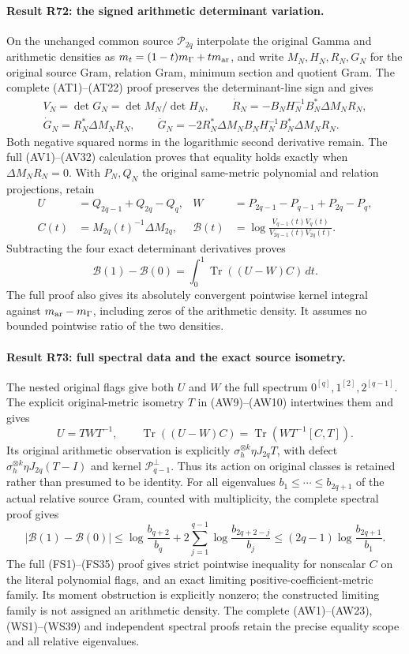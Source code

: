 \paragraph{Result R72: the signed arithmetic determinant variation.}
On the unchanged common source $\mathcal P_{2q}$ interpolate
the original Gamma and arithmetic densities as
$m_t=(1-t)m_\Gamma+tm_{\rm ar}$, and write $M_N,H_N,R_N,G_N$
for the original source Gram, relation Gram, minimum section
and quotient Gram. The complete (AT1)--(AT22) proof preserves
the determinant-line sign and gives
\[
\begin{gathered}
V_N=\det G_N=\det M_N/\det H_N,\qquad
\dot R_N=-B_NH_N^{-1}B_N^*\Delta M_NR_N,\\
\dot G_N=R_N^*\Delta M_NR_N,\qquad
\ddot G_N=-2R_N^*\Delta M_NB_NH_N^{-1}B_N^*\Delta M_NR_N.
\end{gathered}
\]
Both negative squared norms in the logarithmic second
derivative remain. The full (AV1)--(AV32) calculation proves
that equality holds exactly when $\Delta M_NR_N=0$.
With $P_N,Q_N$ the original same-metric polynomial and
relation projections, retain
\[
\begin{aligned}
U&=Q_{2q-1}+Q_{2q}-Q_q,&
W&=P_{2q-1}-P_{q-1}+P_{2q}-P_q,\\
C(t)&=M_{2q}(t)^{-1}\Delta M_{2q},&
\mathcal B(t)&=\log\frac{V_{q-1}(t)V_q(t)}{V_{2q-1}(t)V_{2q}(t)}.
\end{aligned}
\]
Subtracting the four exact determinant derivatives proves
\[
\mathcal B(1)-\mathcal B(0)=\int_0^1\operatorname{Tr}((U-W)C)\,dt.
\]
The full proof also gives its absolutely convergent
pointwise kernel integral against $m_{\rm ar}-m_\Gamma$,
including zeros of the arithmetic density. It assumes
no bounded pointwise ratio of the two densities.

\paragraph{Result R73: full spectral data and the exact source isometry.}
The nested original flags give both $U$ and $W$ the full
spectrum $0^{[q]},1^{[2]},2^{[q-1]}$.
The explicit original-metric isometry $T$ in (AW9)--(AW10)
intertwines them and gives
\[
U=TWT^{-1},\qquad
\operatorname{Tr}((U-W)C)=\operatorname{Tr}(WT^{-1}[C,T]).
\]
Its original arithmetic observation is explicitly
$\sigma_h^{\otimes k}\eta J_{2q}T$, with defect
$\sigma_h^{\otimes k}\eta J_{2q}(T-I)$ and kernel
$\mathcal P_{q-1}^{\perp}$. Thus its action on original
classes is retained rather than presumed to be identity.
For all eigenvalues $b_1\le\cdots\le b_{2q+1}$ of the
actual relative source Gram, counted with multiplicity,
the complete spectral proof gives
\[
|\mathcal B(1)-\mathcal B(0)|
\le\log\frac{b_{q+2}}{b_q}
 +2\sum_{j=1}^{q-1}\log\frac{b_{2q+2-j}}{b_j}
\le(2q-1)\log\frac{b_{2q+1}}{b_1}.
\]
The full (FS1)--(FS35) proof gives strict pointwise
inequality for nonscalar $C$ on the literal polynomial
flags, and an exact limiting positive-coefficient-metric
family. Its moment obstruction is explicitly nonzero;
the constructed limiting family is not assigned an
arithmetic density. The complete (AW1)--(AW23), (WS1)--(WS39)
and independent spectral proofs retain the precise
equality scope and all relative eigenvalues.

